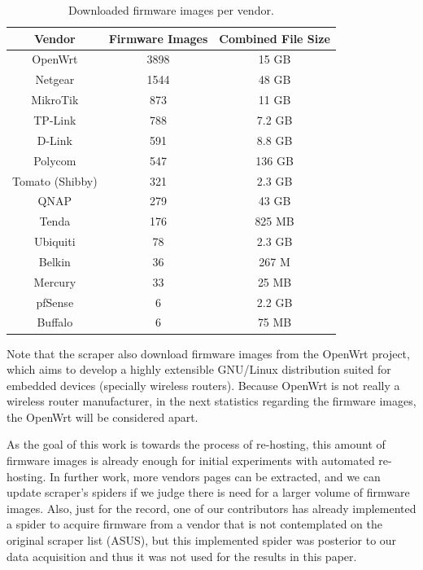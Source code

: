 \begin{table}[H]
\centering
\caption{Downloaded firmware images per vendor.}
\begin{tabular}{ccc}
\hline
\textbf{Vendor} & \textbf{Firmware Images} & \textbf{Combined File Size} \\ \hline
OpenWrt         & 3898                     & 15 GB                       \\ 
Netgear         & 1544                     & 48 GB                       \\ 
MikroTik        & 873                      & 11 GB                       \\ 
TP-Link         & 788                      & 7.2 GB                      \\ 
D-Link          & 591                      & 8.8 GB                      \\ 
Polycom         & 547                      & 136 GB                      \\ 
Tomato (Shibby) & 321                      & 2.3 GB                      \\ 
QNAP            & 279                      & 43 GB                       \\ 
Tenda           & 176                      & 825 MB                      \\ 
Ubiquiti        & 78                       & 2.3 GB                      \\ 
Belkin          & 36                       & 267 M                       \\ 
Mercury         & 33                       & 25 MB                       \\ 
pfSense         & 6                        & 2.2 GB                      \\ 
Buffalo         & 6                        & 75 MB                       \\ \hline

\end{tabular}
\label{tab:scraper}
\end{table}

Note that the scraper also download firmware images from the OpenWrt project, which aims to develop a highly extensible GNU/Linux distribution suited for embedded devices (specially wireless routers). Because OpenWrt is not really a wireless router manufacturer, in the next statistics regarding the firmware images, the OpenWrt will be considered apart.

As the goal of this work is towards the process of re-hosting, this amount of firmware images is already enough for initial experiments with automated re-hosting. In further work, more vendors pages can be extracted, and we can update scraper's spiders if we judge there is need for a larger volume of firmware images. Also, just for the record, one of our contributors has already implemented a spider to acquire firmware from a vendor that is not contemplated on the original scraper list (ASUS), but this implemented spider was posterior to our data acquisition and thus it was not used for the results in this paper.

